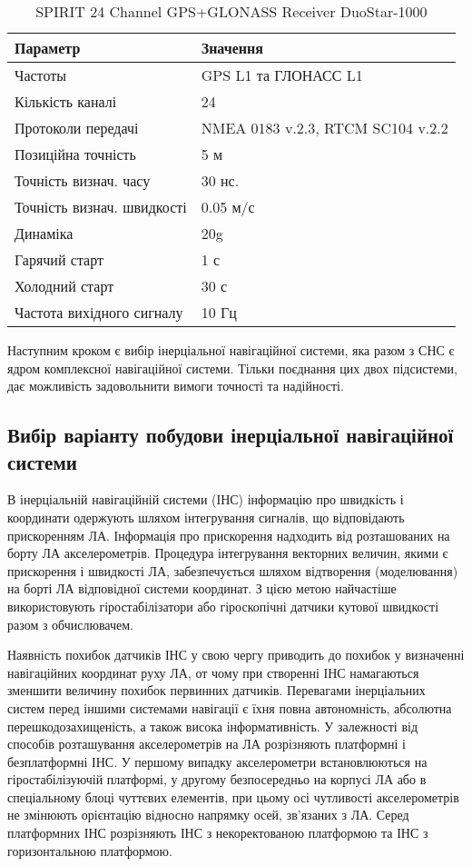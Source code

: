 \begin{table}[here]
\small
\caption{SPIRIT 24 Channel GPS+GLONASS Receiver DuoStar-1000}
\centering
\begin{tabular}{|p{60mm}|p{60mm}|} \hline 
 Параметр & Значення\\ \hline 
 Частоты & GPS L1 та ГЛОНАСС L1\\ \hline 
 Кількість каналі & 24\\ \hline 
 Протоколи передачі & NMEA 0183 v.2.3, RTCM SC104 v.2.2\\ \hline 
 Позиційна точність & 5 м \\ \hline 
 Точність визнач. часу & 30 нс. \\ \hline 
 Точність визнач. швидкості & 0.05 м/с \\ \hline 
 Динаміка & 20g \\ \hline 
 Гарячий старт & 1 с \\ \hline 
 Холодний старт & 30 с \\ \hline 
 Частота вихідного сигналу & 10 Гц \\ \hline 
\end{tabular}
\label{tb:ac}
\end{table}

Наступним кроком є вибір інерціальної навігаційної системи, яка разом з СНС є ядром комплексної навігаційної системи. Тільки поєднання цих двох підсистеми, дає можливість задовольнити вимоги точності та надійності.

\subsection{Вибір варіанту побудови інерціальної навігаційної системи}

В інерціальній  навігаційній системи (ІНС)  інформацію про швидкість і 
координати одержують шляхом інтегрування сигналів, що відповідають прискоренням 
ЛА. Інформація про прискорення надходить від розташованих на борту ЛА 
акселерометрів. Процедура інтегрування векторних величин, якими є прискорення і 
швидкості ЛА, забезпечується шляхом відтворення (моделювання) на борті ЛА відповідної 
системи координат. З цією метою найчастіше використовують гіростабілізатори 
або гіроскопічні датчики кутової швидкості разом з обчислювачем. 

Наявність похибок датчиків ІНС у свою чергу приводить до похибок 
у визначенні навігаційних координат руху ЛА, от чому при створенні 
ІНС намагаються зменшити величину похибок первинних датчиків.
Перевагами інерціальних систем перед іншими системами навігації є їхня 
повна автономність, абсолютна перешкодозахищеність, а також висока інформативність.
У залежності від способів розташування акселерометрів на ЛА розрізняють платформні 
і безплатформні ІНС. У першому випадку акселерометри встановлюються на 
гіростабілізуючій платформі, у другому безпосередньо на корпусі ЛА або в 
спеціальному блоці чуттєвих елементів, при цьому осі чутливості акселерометрів 
не змінюють орієнтацію відносно напрямку осей, зв'язаних з ЛА.
Серед платформних ІНС розрізняють ІНС з некоректованою платформою та 
ІНС з горизонтальною платформою. 

